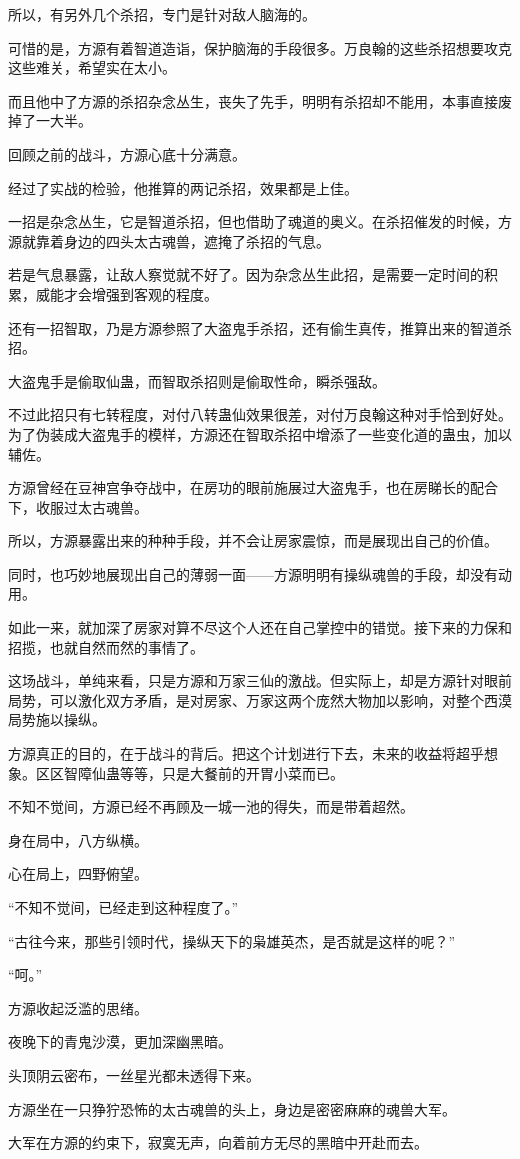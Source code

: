 \begin{this_body}
所以，有另外几个杀招，专门是针对敌人脑海的。

可惜的是，方源有着智道造诣，保护脑海的手段很多。万良翰的这些杀招想要攻克这些难关，希望实在太小。

而且他中了方源的杀招杂念丛生，丧失了先手，明明有杀招却不能用，本事直接废掉了一大半。

回顾之前的战斗，方源心底十分满意。

经过了实战的检验，他推算的两记杀招，效果都是上佳。

一招是杂念丛生，它是智道杀招，但也借助了魂道的奥义。在杀招催发的时候，方源就靠着身边的四头太古魂兽，遮掩了杀招的气息。

若是气息暴露，让敌人察觉就不好了。因为杂念丛生此招，是需要一定时间的积累，威能才会增强到客观的程度。

还有一招智取，乃是方源参照了大盗鬼手杀招，还有偷生真传，推算出来的智道杀招。

大盗鬼手是偷取仙蛊，而智取杀招则是偷取性命，瞬杀强敌。

不过此招只有七转程度，对付八转蛊仙效果很差，对付万良翰这种对手恰到好处。为了伪装成大盗鬼手的模样，方源还在智取杀招中增添了一些变化道的蛊虫，加以辅佐。

方源曾经在豆神宫争夺战中，在房功的眼前施展过大盗鬼手，也在房睇长的配合下，收服过太古魂兽。

所以，方源暴露出来的种种手段，并不会让房家震惊，而是展现出自己的价值。

同时，也巧妙地展现出自己的薄弱一面——方源明明有操纵魂兽的手段，却没有动用。

如此一来，就加深了房家对算不尽这个人还在自己掌控中的错觉。接下来的力保和招揽，也就自然而然的事情了。

这场战斗，单纯来看，只是方源和万家三仙的激战。但实际上，却是方源针对眼前局势，可以激化双方矛盾，是对房家、万家这两个庞然大物加以影响，对整个西漠局势施以操纵。

方源真正的目的，在于战斗的背后。把这个计划进行下去，未来的收益将超乎想象。区区智障仙蛊等等，只是大餐前的开胃小菜而已。

不知不觉间，方源已经不再顾及一城一池的得失，而是带着超然。

身在局中，八方纵横。

心在局上，四野俯望。

“不知不觉间，已经走到这种程度了。”

“古往今来，那些引领时代，操纵天下的枭雄英杰，是否就是这样的呢？”

“呵。”

方源收起泛滥的思绪。

夜晚下的青鬼沙漠，更加深幽黑暗。

头顶阴云密布，一丝星光都未透得下来。

方源坐在一只狰狞恐怖的太古魂兽的头上，身边是密密麻麻的魂兽大军。

大军在方源的约束下，寂寞无声，向着前方无尽的黑暗中开赴而去。

\end{this_body}

